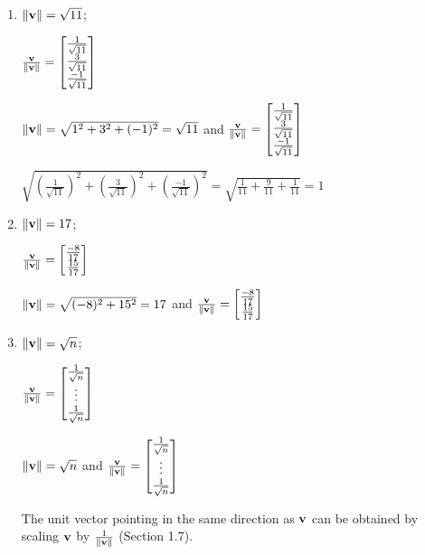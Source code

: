 \begin{solution}
\begin{enumerate}
  \item 
  	\begin{answer}
	  	$\left\lVert \mathbf{v} \right\rVert = \sqrt{11}$;
	
		$\frac{\mathbf{v}}{\left\lVert \mathbf{v} \right\rVert} = \begin{bmatrix}
			\frac{1}{\sqrt{11}}\\
			\frac{3}{\sqrt{11}}\\
			\frac{-1}{\sqrt{11}}
		\end{bmatrix}$
	\end{answer}
	
	$\left\lVert \mathbf{v} \right\rVert = \sqrt{1^2 + 3^2 + (-1)^2} = \sqrt{11}$ and $\frac{\mathbf{v}}{\left\lVert \mathbf{v} \right\rVert} =
	\begin{bmatrix}
		\frac{1}{\sqrt{11}}\\
		\frac{3}{\sqrt{11}}\\
		\frac{-1}{\sqrt{11}}
	\end{bmatrix}$
	
	$\sqrt{(\frac{1}{\sqrt{11}})^2 + (\frac{3}{\sqrt{11}})^2 + (\frac{-1}{\sqrt{11}})^2} = \sqrt{\frac{1}{11} + \frac{9}{11} + \frac{1}{11}} = 1$
	
  \item
  \begin{answer}
  $\left\lVert \mathbf{v} \right\rVert = 17$;
  
      $\frac{\mathbf{v}}{\left\lVert \mathbf{v} \right\rVert} = \begin{bmatrix}
			\frac{-8}{17} \\ \frac{15}{17}
		\end{bmatrix}$
\end{answer}
		$\left\lVert \mathbf{v} \right\rVert = \sqrt{(-8)^2 + 15^2} = 17$ and $\frac{\mathbf{v}}{\left\lVert \mathbf{v} \right\rVert} = 
		\begin{bmatrix}
			\frac{-8}{17} \\ \frac{15}{17}
		\end{bmatrix}$
  \item
  	\begin{answer}
	$\left\lVert \mathbf{v} \right\rVert = \sqrt{n}$;
	
	
		$\frac{\mathbf{v}}{\left\lVert \mathbf{v} \right\rVert} = \begin{bmatrix}
			\frac{1}{\sqrt{n}}\\
			\vdots\\
			\frac{1}{\sqrt{n}}
		\end{bmatrix}$
	\end{answer}
  
  	$\left\lVert \mathbf{v} \right\rVert = \sqrt{n}$ and $\frac{\mathbf{v}}{\left\lVert \mathbf{v} \right\rVert} = 
	\begin{bmatrix}
		\frac{1}{\sqrt{n}}\\
		\vdots\\
		\frac{1}{\sqrt{n}}
	\end{bmatrix}
	$
  
  The unit vector pointing in the same direction as $\mathbf{v}$ can be obtained by scaling $\mathbf{v}$ by $\frac{1}{\left\lVert \mathbf{v} \right\rVert}$ (Section 1.7).
\end{enumerate}
\end{solution}

